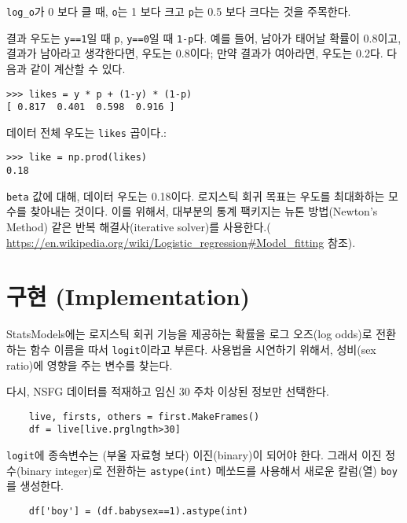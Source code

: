 \verb"log_o"가 0 보다 클 때, 
{\tt o}는 1 보다 크고 {\tt p}는 0.5 보다 크다는 것을 주목한다.

결과 우도는 {\tt y==1}일 때 {\tt p}, {\tt y==0}일 때 {\tt 1-p}다.
예를 들어, 남아가 태어날 확률이 0.8이고, 결과가 남아라고 생각한다면, 우도는 0.8이다; 만약 결과가 여아라면, 우도는 0.2다. 다음과 같이 계산할 수 있다.

\begin{verbatim}
>>> likes = y * p + (1-y) * (1-p)
[ 0.817  0.401  0.598  0.916 ]
\end{verbatim}

데이터 전체 우도는 {\tt likes} 곱이다.:

\begin{verbatim}
>>> like = np.prod(likes)
0.18
\end{verbatim}

{\tt beta} 값에 대해, 데이터 우도는 0.18이다. 로지스틱 회귀 목표는 우도를 최대화하는 모수를 찾아내는 것이다. 이를 위해서, 대부분의 통계 팩키지는 뉴톤 방법(Newton's Method) 같은 반복 해결사(iterative solver)를 사용한다.(
\url{https://en.wikipedia.org/wiki/Logistic_regression#Model_fitting} 참조).


\section{구현 (Implementation)}
\label{implementation}

StatsModels에는 로지스틱 회귀 기능을 제공하는 확률을 로그 오즈(log odds)로 전환하는 함수 이름을 따서 {\tt logit}이라고 부른다.
사용법을 시연하기 위해서, 성비(sex ratio)에 영향을 주는 변수를 찾는다.

다시, NSFG 데이터를 적재하고 임신 30 주차 이상된 정보만 선택한다.

\begin{verbatim}
    live, firsts, others = first.MakeFrames()
    df = live[live.prglngth>30]
\end{verbatim}

{\tt logit}에 종속변수는 (부울 자료형 보다) 이진(binary)이 되어야 한다. 그래서 이진 정수(binary integer)로 전환하는 {\tt astype(int)} 메쏘드를 사용해서 새로운 칼럼(열) {\tt boy}를 생성한다.


\begin{verbatim}
    df['boy'] = (df.babysex==1).astype(int)
\end{verbatim}

